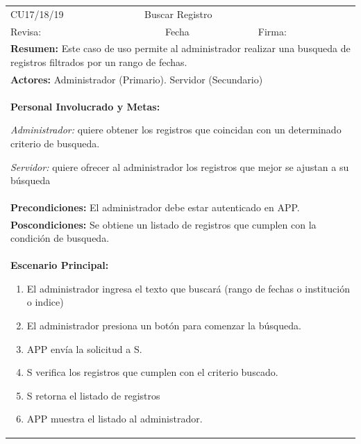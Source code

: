 \begin{longtable}{|l|p{5.5cm}|l|p{2cm}|l|p{1.9cm}|} \hline
    \cellcolor{grisOscuro} CU17/18/19 & \multicolumn{4}{|l|}{  \cellcolor{grisOscuro} Buscar Registro} &  \cellcolor{grisClaro}\multirow{2}{1cm}{} \\ \cline{1-5}
    \cellcolor{grisOscuro} Revisa: &  \cellcolor{grisClaro} &  \cellcolor{grisOscuro} Fecha &  \cellcolor{grisClaro} &  \cellcolor{grisOscuro} Firma: & \cellcolor{grisClaro} \\ \hline
    \multicolumn{6}{|p{15cm}|}{ \textbf{Resumen: } Este caso de uso permite al administrador realizar una busqueda de registros filtrados por un rango de fechas.

    } \\ \hline

    \multicolumn{6}{|p{15cm}|}{ \textbf{Actores: } Administrador (Primario). Servidor (Secundario)

    } \\ \hline

    \multicolumn{6}{|p{15cm}|}{ \textbf{Personal Involucrado y Metas: }
    
    \emph{Administrador:} quiere obtener los registros que coincidan con un determinado criterio de busqueda.

    \emph{Servidor:} quiere ofrecer al administrador los registros que mejor se ajustan a su búsqueda

    } \\ \hline

    \multicolumn{6}{|p{15cm}|}{ \textbf{Precondiciones: } El administrador debe estar autenticado en APP.

    } \\ \hline

    \multicolumn{6}{|p{15cm}|}{ \textbf{Poscondiciones: } Se obtiene un listado de registros que cumplen con la condición de busqueda.

    } \\ \hline

    \multicolumn{6}{|p{15cm}|}{ \textbf{Escenario Principal: }

    \begin{enumerate}
        \item El administrador ingresa el texto que buscará (rango de fechas o institución o indice)
        \item El administrador presiona un botón para comenzar la búsqueda.
        \item APP envía la solicitud a S.
        \item S verifica los registros que cumplen con el criterio buscado.
        \item S retorna el listado de registros
        \item APP muestra el listado al administrador.
    \end{enumerate}

}
\end{longtable}
